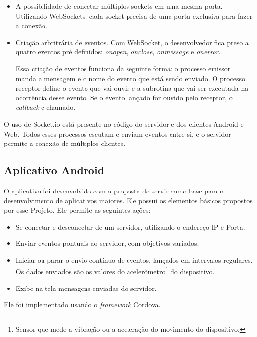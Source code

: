 \documentclass[a4paper,12pt]{article}
\begin{document}
\begin{itemize}

\item A possibilidade de conectar múltiplos sockets em uma mesma porta. Utilizando WebSockets, cada socket precisa de uma porta exclusiva para fazer a conexão.

\item Criação arbritrária de eventos. Com WebSocket, o desenvolvedor fica preso a quatro eventos pré definidos: \emph{onopen}, \emph{onclose}, \emph{onmessage} e \emph{onerror}.

Essa criação de eventos funciona da seguinte forma: o processo emissor manda a mensagem e o nome do evento que está sendo enviado. O processo receptor define o evento que vai ouvir e a subrotina que vai ser executada na ocorrência desse evento. Se o evento lançado for ouvido pelo receptor, o \emph{callback} é chamado.
\end{itemize}

O uso de Socket.io está presente no código do servidor e dos clientes Android e Web. Todos esses processos escutam e enviam eventos entre si, e o servidor permite a conexão de múltiplos clientes.



\newpage
\subsection{Aplicativo Android}

O aplicativo foi desenvolvido com a proposta de servir como base para o desenvolvimento de aplicativos maiores. Ele possui os elementos básicos propostos por esse Projeto. Ele permite as seguintes ações:

\begin{itemize}
  \item Se conectar e desconectar de um servidor, utilizando o endereço IP e Porta.
  \item Enviar eventos pontuais ao servidor, com objetivos variados.
  \item Iniciar ou parar o envio contínuo de eventos, lançados em intervalos regulares. Os dados enviados são os valores do acelerômetro\footnote{Sensor que mede a vibração ou a aceleração do movimento do dispositivo.} do dispositivo.
  \item Exibe na tela mensagens enviadas do servidor.
\end{itemize}

Ele foi implementado usando o \emph{framework} Cordova.
\end{document}
